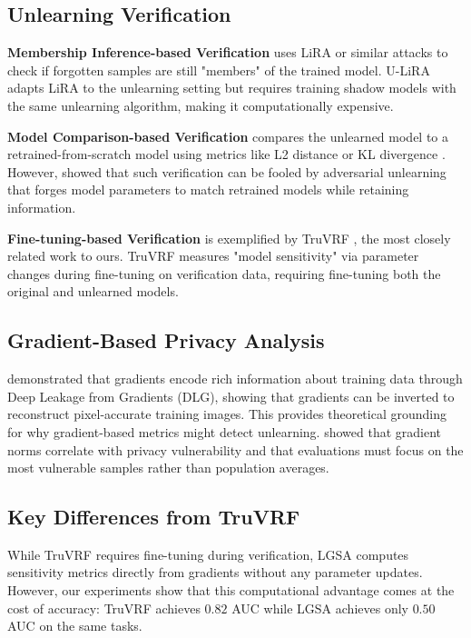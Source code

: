 \documentclass{article}
\begin{document}
\subsection{Unlearning Verification}

\textbf{Membership Inference-based Verification} uses LiRA \cite{carlini2022membership} or similar attacks to check if forgotten samples are still "members" of the trained model. U-LiRA \cite{hayes2024informed} adapts LiRA to the unlearning setting but requires training shadow models with the same unlearning algorithm, making it computationally expensive.

\textbf{Model Comparison-based Verification} compares the unlearned model to a retrained-from-scratch model using metrics like L2 distance or KL divergence \cite{thudi2022unrolling}. However, \citet{zhang2024verification} showed that such verification can be fooled by adversarial unlearning that forges model parameters to match retrained models while retaining information.

\textbf{Fine-tuning-based Verification} is exemplified by TruVRF \cite{zhou2024truvrf}, the most closely related work to ours. TruVRF measures "model sensitivity" via parameter changes during fine-tuning on verification data, requiring fine-tuning both the original and unlearned models.

\subsection{Gradient-Based Privacy Analysis}

\citet{zhu2019deep} demonstrated that gradients encode rich information about training data through Deep Leakage from Gradients (DLG), showing that gradients can be inverted to reconstruct pixel-accurate training images. This provides theoretical grounding for why gradient-based metrics might detect unlearning. \cite{aerni2024evaluations} showed that gradient norms correlate with privacy vulnerability and that evaluations must focus on the most vulnerable samples rather than population averages.

\subsection{Key Differences from TruVRF}

While TruVRF requires fine-tuning during verification, LGSA computes sensitivity metrics directly from gradients without any parameter updates. However, our experiments show that this computational advantage comes at the cost of accuracy: TruVRF achieves $0.82$ AUC while LGSA achieves only $0.50$ AUC on the same tasks.
\end{document}
